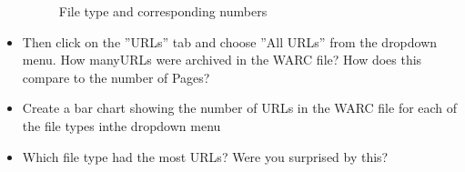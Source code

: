 \documentclass[12pt]{article}
\begin{document}
\begin{itemize}
\begin{figure}[H]
                \caption{File type and corresponding numbers}
                \label{fig:Q3Ans}
            \end{figure}
    \item Then  click  on  the  ”URLs”  tab  and  choose  ”All  URLs”  from  the  dropdown  menu.   How  manyURLs were archived in the WARC file? How does this compare to the number of Pages?
    \item Create a bar chart showing the number of URLs in the WARC file for each of the file types inthe dropdown menu
    \item Which file type had the most URLs? Were you surprised by this?
    
\end{itemize}
\end{document}
